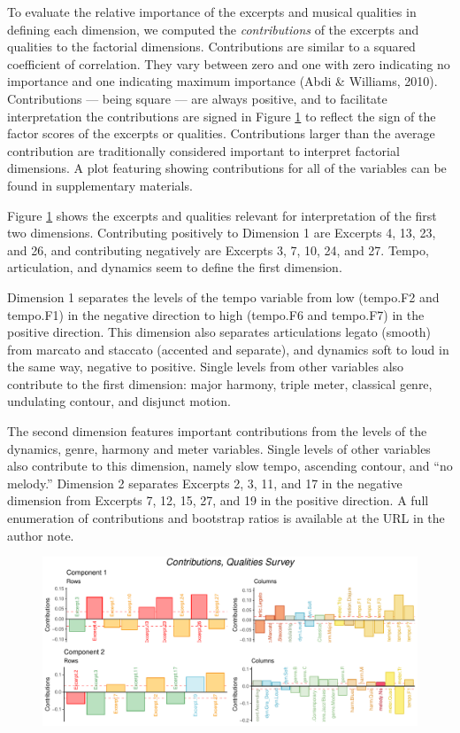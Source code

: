 \documentclass[
  english,
  man,floatsintext]{apa6}
\begin{document}
To evaluate the relative importance of the excerpts and musical qualities in defining each dimension, we computed the \emph{contributions} of the excerpts and qualities to the factorial dimensions. Contributions are similar to a squared coefficient of correlation. They vary between zero and one with zero indicating no importance and one indicating maximum importance (Abdi \& Williams, 2010). Contributions --- being square --- are always positive, and to facilitate interpretation the contributions are signed in Figure \ref{fig:contributionsQ} to reflect the sign of the factor scores of the excerpts or qualities. Contributions larger than the average contribution are traditionally considered important to interpret factorial dimensions. A plot featuring showing contributions for all of the variables can be found in supplementary materials.

Figure \ref{fig:contributionsQ} shows the excerpts and qualities relevant for interpretation of the first two dimensions. Contributing positively to Dimension 1 are Excerpts 4, 13, 23, and 26, and contributing negatively are Excerpts 3, 7, 10, 24, and 27. Tempo, articulation, and dynamics seem to define the first dimension.

Dimension 1 separates the levels of the tempo variable from low (tempo.F2 and tempo.F1) in the negative direction to high (tempo.F6 and tempo.F7) in the positive direction. This dimension also separates articulations legato (smooth) from marcato and staccato (accented and separate), and dynamics soft to loud in the same way, negative to positive. Single levels from other variables also contribute to the first dimension: major harmony, triple meter, classical genre, undulating contour, and disjunct motion.

The second dimension features important contributions from the levels of the dynamics, genre, harmony and meter variables. Single levels of other variables also contribute to this dimension, namely slow tempo, ascending contour, and ``no melody.'' Dimension 2 separates Excerpts 2, 3, 11, and 17 in the negative dimension from Excerpts 7, 12, 15, 27, and 19 in the positive direction. A full enumeration of contributions and bootstrap ratios is available at the URL in the author note.

\begin{figure}

{\centering \includegraphics{Music-Descriptor-Space_files/figure-latex/contributionsQ-1} 

}

\caption{ }\label{fig:contributionsQ}
\end{figure}
\end{document}
